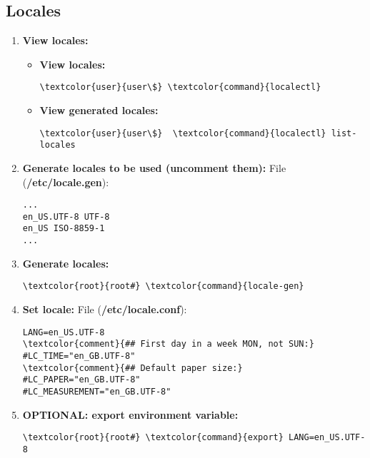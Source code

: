 \documentclass[10pt, a4paper, onecolumn, openany]{book} %
\begin{document}
\subsection{Locales}
    \begin{enumerate}
        \item \textbf{View locales:}
        \begin{itemize}
            \item \textbf{View locales:}
\begin{Verbatim}[commandchars=\\\{\}]
\textcolor{user}{user\$} \textcolor{command}{localectl}
\end{Verbatim}            
            \item \textbf{View generated locales:}
\begin{Verbatim}[commandchars=\\\{\}]
\textcolor{user}{user\$}  \textcolor{command}{localectl} list-locales
\end{Verbatim}
        \end{itemize}
    
        \item \textbf{Generate locales to be used (uncomment them):}
\newline File (\textbf{\textcolor{file}{/etc/locale.gen}}):
\begin{Verbatim}[commandchars=\\\{\}]
...
en_US.UTF-8 UTF-8
en_US ISO-8859-1
...
\end{Verbatim}
        \item \textbf{Generate locales:}
\begin{Verbatim}[commandchars=\\\{\}]
\textcolor{root}{root#} \textcolor{command}{locale-gen}
\end{Verbatim}      
        \item \textbf{Set locale:}
\newline File (\textbf{\textcolor{file}{/etc/locale.conf}}):
\begin{Verbatim}[commandchars=\\\{\}]
LANG=en_US.UTF-8
\textcolor{comment}{## First day in a week MON, not SUN:}
#LC_TIME="en_GB.UTF-8"
\textcolor{comment}{## Default paper size:}
#LC_PAPER="en_GB.UTF-8"
#LC_MEASUREMENT="en_GB.UTF-8"
\end{Verbatim}
        \item \textbf{OPTIONAL: export environment variable:}
\begin{Verbatim}[commandchars=\\\{\}]
\textcolor{root}{root#} \textcolor{command}{export} LANG=en_US.UTF-8
\end{Verbatim}    
    \end{enumerate}
\end{document}
